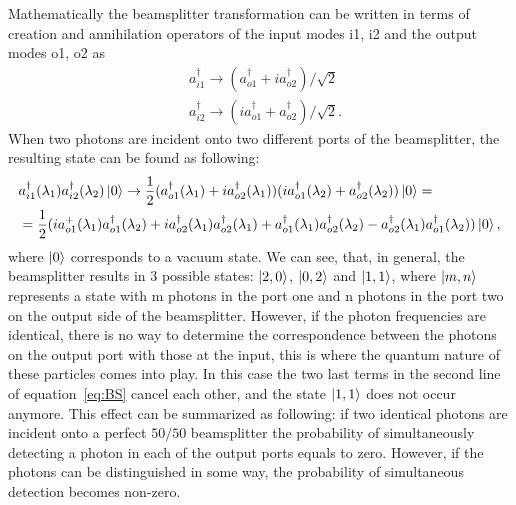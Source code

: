 Mathematically the beamsplitter transformation can be written in terms of creation and annihilation operators of the input modes i1, i2 and the output modes o1, o2 as
\begin{equation}
\begin{aligned}
& a_{i1}^{\dagger} \rightarrow (a_{o1}^{\dagger} + ia_{o2}^{\dagger} )/\sqrt{2} \\
& a_{i2}^{\dagger} \rightarrow (ia_{o1}^{\dagger} + a_{o2}^{\dagger} )/\sqrt{2}.
\end{aligned}
\end{equation}
When two photons are incident onto two different ports of the beamsplitter, the resulting state can be found as following:
\begin{equation}
\begin{split}
& a_{i1}^{\dagger}(\lambda_1) a^{\dagger}_{i2}(\lambda_2) \left|0\right\rangle \rightarrow  \frac{1}{2} (a_{o1}^{\dagger}(\lambda_1) +ia_{o2}^{\dagger}(\lambda_1) ) (ia_{o1}^{\dagger}(\lambda_2) +a_{o2}^{\dagger}(\lambda_2) )\left|0\right\rangle = \\
&=\frac{1}{2} (i a_{o1}^+(\lambda_1) a_{o1}^{\dagger}(\lambda_2) + ia_{o2}^{\dagger}(\lambda_1)a_{o2}^{\dagger}(\lambda_1) +a_{o1}^{\dagger}(\lambda_1) a_{o2}^{\dagger}(\lambda_2) - a_{o2}^{\dagger}(\lambda_1) a_{o1}^{\dagger}(\lambda_2))\left|0\right\rangle,
\end{split}
\label{eq:BS}
\end{equation}
where $\left|0\right\rangle$ corresponds to a vacuum state. We can see, that, in general, the beamsplitter results in $3$ possible states: $\left|2,0\right\rangle$, $\left|0,2\right\rangle$ and $\left|1,1\right\rangle$, where $\left|m,n\right\rangle$ represents a state with m photons in the port one and n photons in the port two on the output side of the beamsplitter. However, if the photon frequencies are identical, there is no way to determine the correspondence between the photons on the output port with those at the input, this is where the quantum nature of these particles comes into play. In this case the two last terms in the second line of equation~\ref{eq:BS} cancel each other, and the state $\left|1,1\right\rangle$ does not occur anymore. This effect can be summarized as following: if two identical photons are incident onto a perfect $50/50$ beamsplitter the probability of simultaneously detecting a photon in each of the output ports equals to zero. However, if the photons can be distinguished in some way, the probability of simultaneous detection becomes non-zero.

